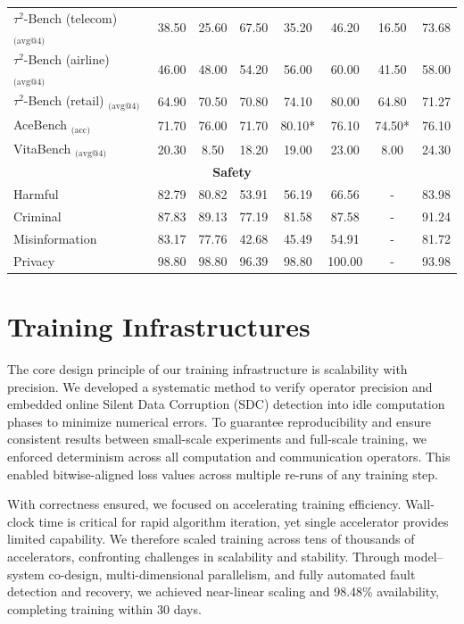 \documentclass{article}
\begin{document}
\begin{table}[htbp]
{\begin{tabular}{l|ccc|ccc|c}
         $\tau^2$-Bench (telecom) $_{\text{(avg@4)}}$  & 38.50 & 25.60 & 67.50 & 35.20 & 46.20 & 16.50 & 73.68 \\ 
         $\tau^2$-Bench (airline) $_{\text{(avg@4)}}$ & 46.00 & 48.00 & 54.20 & 56.00 & 60.00 & 41.50 & 58.00 \\ 
         $\tau^2$-Bench (retail) $_{\text{(avg@4)}}$  & 64.90 & 70.50 & 70.80 & 74.10 & 80.00 & 64.80 & 71.27 \\ 
         AceBench $_{\text{(acc)}}$  & 71.70 & 76.00 & 71.70 & 80.10* & 76.10 & 74.50* & 76.10 \\
         VitaBench $_{\text{(avg@4)}}$  & 20.30 & 8.50 & 18.20 & 19.00 & 23.00 & 8.00 & 24.30 \\
         \midrule 
         \multicolumn{8}{c}{\textbf{Safety}} \\ 
         \midrule 
         Harmful        & 82.79 & 80.82 & 53.91 & 56.19 &  66.56  & - & 83.98   \\ 
        Criminal       & 87.83 & 89.13 & 77.19 & 81.58 & 87.58  & - & 91.24   \\
        Misinformation & 83.17 & 77.76 & 42.68 & 45.49 & 54.91  & - & 81.72   \\
        Privacy        & 98.80 & 98.80 & 96.39 & 98.80 & 100.00 & - & 93.98   \\
         \bottomrule 
     \end{tabular}
     } 
 \end{table}

\section{Training Infrastructures}
The core design principle of our training infrastructure is scalability with precision. We developed a systematic method to verify operator precision and embedded online Silent Data Corruption (SDC) detection into idle computation phases to minimize numerical errors. To guarantee reproducibility and ensure consistent results between small-scale experiments and full-scale training, we enforced determinism across all computation and communication operators. This enabled bitwise-aligned loss values across multiple re-runs of any training step.

With correctness ensured, we focused on accelerating training efficiency. Wall-clock time is critical for rapid algorithm iteration, yet single accelerator provides limited capability. We therefore scaled training across tens of thousands of accelerators, confronting challenges in scalability and stability. Through model–system co-design, multi-dimensional parallelism, and fully automated fault detection and recovery, we achieved near-linear scaling and 98.48\% availability, completing training within 30 days.
\end{document}

